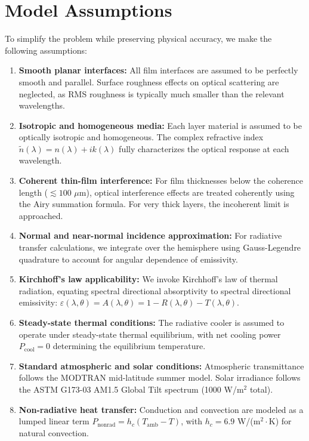 \section{Model Assumptions}

To simplify the problem while preserving physical accuracy, we make the following assumptions:

\begin{enumerate}
  \item \textbf{Smooth planar interfaces:} All film interfaces are assumed to be perfectly smooth and parallel. Surface roughness effects on optical scattering are neglected, as RMS roughness is typically much smaller than the relevant wavelengths.

  \item \textbf{Isotropic and homogeneous media:} Each layer material is assumed to be optically isotropic and homogeneous. The complex refractive index $\tilde{n}(\lambda) = n(\lambda) + i k(\lambda)$ fully characterizes the optical response at each wavelength.

  \item \textbf{Coherent thin-film interference:} For film thicknesses below the coherence length ($\lesssim 100$ $\mu$m), optical interference effects are treated coherently using the Airy summation formula. For very thick layers, the incoherent limit is approached.

  \item \textbf{Normal and near-normal incidence approximation:} For radiative transfer calculations, we integrate over the hemisphere using Gauss-Legendre quadrature to account for angular dependence of emissivity.

  \item \textbf{Kirchhoff's law applicability:} We invoke Kirchhoff's law of thermal radiation, equating spectral directional absorptivity to spectral directional emissivity: $\varepsilon(\lambda, \theta) = A(\lambda, \theta) = 1 - R(\lambda, \theta) - T(\lambda, \theta)$.

  \item \textbf{Steady-state thermal conditions:} The radiative cooler is assumed to operate under steady-state thermal equilibrium, with net cooling power $P_{\text{cool}} = 0$ determining the equilibrium temperature.

  \item \textbf{Standard atmospheric and solar conditions:} Atmospheric transmittance follows the MODTRAN mid-latitude summer model. Solar irradiance follows the ASTM G173-03 AM1.5 Global Tilt spectrum (1000 W/m$^2$ total).

  \item \textbf{Non-radiative heat transfer:} Conduction and convection are modeled as a lumped linear term $P_{\text{nonrad}} = h_c(T_{\text{amb}} - T)$, with $h_c = 6.9$ W/(m$^2\cdot$K) for natural convection.
\end{enumerate}
